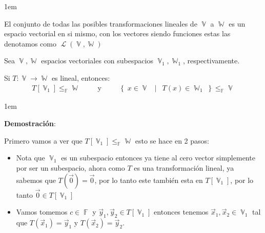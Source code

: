 \documentclass[12pt, fleqn]{report}                             %
\newenvironment{SmallIndentation}[1][0.75em]                    %
        {\begin{adjustwidth}{#1}{}\begin{footnotesize}}             %
        {\end{footnotesize}\end{adjustwidth}}                       %
\DeclareMathOperator \Space     {\quad}                         %
\DeclareMathOperator \MiniSpace {\;}                            %
\newcommand \Such           {\MiniSpace | \MiniSpace}           %
\newcommand \Also           {\MiniSpace \text{y} \MiniSpace}    %
\theoremstyle{break}                                            %
\DeclareMathOperator \GenericField {\mathbb{F}}                 %
\DeclareMathOperator \VectorSet    {\mathbb{V}}                 %
\DeclareMathOperator \SubVectorSet {\mathbb{W}}                 %
\DeclareMathOperator \LinTrans      {\mathcal{T}}               %
\DeclareMathOperator \Laplace       {\mathcal{L}}               %
\newcommand{\Set}[1]            {\left\{ \; #1 \; \right\}}     %
\begin{document}
\begin{itemize}
\begin{SmallIndentation}[1em]
                        \item
                            El conjunto de todas las posibles transformaciones lineales de $\VectorSet$
                            a $\SubVectorSet$ es un espacio vectorial en si mismo, con los vectores
                            siendo funciones estas las denotamos como $\Laplace(\VectorSet, \SubVectorSet)$
                        
                        \end{SmallIndentation}

                    \item
                        Sea $\VectorSet, \SubVectorSet$ espacios vectoriales con subespacios 
                        $\VectorSet_1, \SubVectorSet_1$, respectivamente. 

                        Si $T : \VectorSet \to \SubVectorSet$ es lineal, entonces:
                        \begin{align*}
                            T[\VectorSet_1] \leq_{\GenericField} \SubVectorSet
                            \Space \Also \Space     
                            \Set{x \in \VectorSet \Such T(x) \in \SubVectorSet_1} \leq_{\GenericField} \VectorSet   
                        \end{align*} 

                        \begin{SmallIndentation}[1em]
                            \textbf{Demostración}:
                            
                            Primero vamos a ver que $T[\VectorSet_1] \leq_{\GenericField} \SubVectorSet$
                            esto se hace en 2 pasos:
                            \begin{itemize}
                                \item 
                                    Nota que $\VectorSet_1$ es un subespacio entonces ya tiene al cero
                                    vector simplemente por ser un subespacio, ahora como $T$ es una transformación
                                    lineal, ya sabemos que $T(\vec 0) = \vec 0$, por lo tanto este también 
                                    esta en $T[\VectorSet_1]$, por lo tanto $\vec 0 \in T[\VectorSet_1]$

                                \item
                                    Vamos tomemos $c \in \GenericField$ y $\vec y_1, \vec y_2 \in T[\VectorSet_1]$
                                    entonces tenemos $\vec x_1, \vec x_2 \in \VectorSet_1$ tal que 
                                    $T(\vec x_1) = \vec y_1$ y $T(\vec x_2) = \vec y_2$.


\end{itemize}
\end{SmallIndentation}
\end{itemize}
\end{document}
